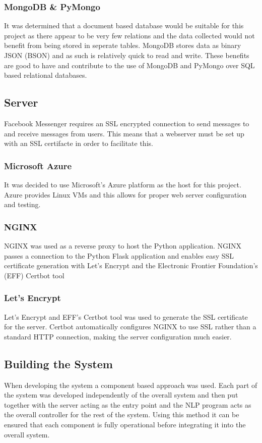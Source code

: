 \documentclass[12pt,a4paper]{article}
\begin{document}
    \subsubsection{MongoDB \& PyMongo}
    \label{subsubsection:mongodb}
    It was determined that a document based database would be suitable for this project as there appear to be very few relations and the data collected would not benefit from being stored in seperate tables. MongoDB stores data as binary JSON (BSON) \citep{korneliusz_2014} and as such is relatively quick to read and write. These benefits are good to have and contribute to the use of MongoDB and PyMongo over SQL based relational databases.
    
    \subsection{Server}
    \label{subsection:Server}
    Facebook Messenger requires an SSL encrypted connection to send messages to and receive messages from users. This means that a webserver must be set up with an SSL certifacte in order to facilitate this.
    \subsubsection{Microsoft Azure}
    It was decided to use Microsoft's Azure platform as the host for this project. Azure provides Linux VMs and this allows for proper web server configuration and testing.
    
    \subsubsection{NGINX}
    NGINX was used as a reverse proxy to host the Python application. NGINX passes a connection to the Python Flask application and enables easy SSL certificate generation with Let's Encrypt and the Electronic Frontier Foundation's (EFF) Certbot tool %
    
    \subsubsection{Let's Encrypt}
    Let's Encrypt and EFF's Certbot tool was used to generate the SSL certificate for the server. Certbot automatically configures NGINX to use SSL rather than a standard HTTP connection, making the server configuration much easier.
    
    \subsection{Building the System}
    When developing the system a component based approach was used. Each part of the system was developed independently of the overall system and then put together with the server acting as the entry point and the NLP program acts as the overall controller for the rest of the system. Using this method it can be ensured that each component is fully operational before integrating it into the overall system.
    
\end{document}
